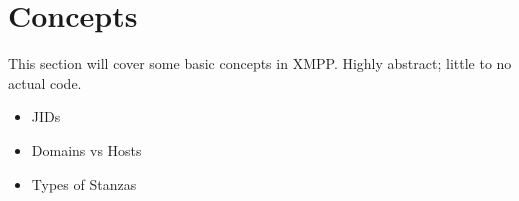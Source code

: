 \part{Concepts}

\newpage
This section will cover some basic concepts in XMPP.  Highly abstract; little to no
actual code.

\begin{itemize}
\item JIDs
\item Domains vs Hosts
\item Types of Stanzas
\end{itemize}
